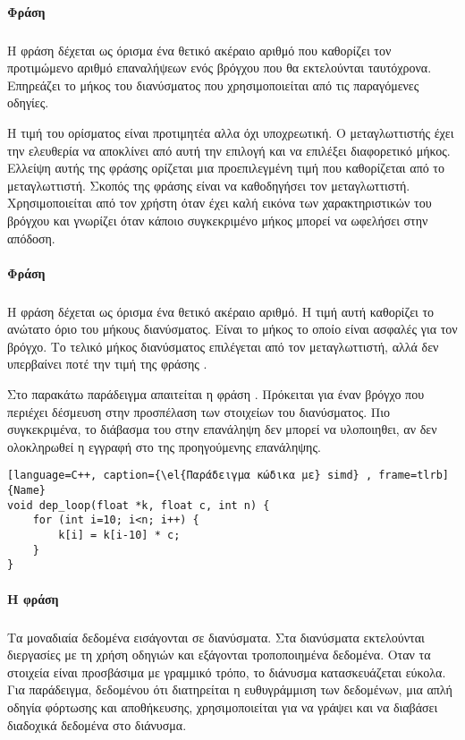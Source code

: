 \paragraph{Φράση \emph{}}
\subparagraph{}
Η φράση \emph{} δέχεται ως όρισμα ένα θετικό ακέραιο αριθμό που καθορίζει τον προτιμώμενο αριθμό επαναλήψεων ενός βρόγχου που θα εκτελούνται ταυτόχρονα. Επηρεάζει το μήκος του διανύσματος που χρησιμοποιείται από τις παραγόμενες \emph{} οδηγίες.

Η τιμή του ορίσματος είναι προτιμητέα αλλα όχι υποχρεωτική. Ο μεταγλωττιστής έχει την ελευθερία να αποκλίνει από αυτή την επιλογή και να επιλέξει διαφορετικό μήκος. Ελλείψη αυτής της φράσης ορίζεται μια προεπιλεγμένη τιμή που καθορίζεται από το μεταγλωττιστή. Σκοπός της φράσης \emph{} είναι να καθοδηγήσει τον μεταγλωττιστή. Χρησιμοποιείται από τον χρήστη όταν έχει καλή εικόνα των χαρακτηριστικών του βρόγχου και γνωρίζει όταν κάποιο συγκεκριμένο μήκος μπορεί να ωφελήσει στην απόδοση.

\paragraph{Φράση \emph{}}
\subparagraph{}
Η φράση \emph{} δέχεται ως όρισμα ένα θετικό ακέραιο αριθμό. Η τιμή αυτή καθορίζει το ανώτατο όριο του μήκους διανύσματος. Είναι το μήκος το οποίο είναι ασφαλές για τον βρόγχο. Το τελικό μήκος διανύσματος επιλέγεται από τον μεταγλωττιστή, αλλά δεν υπερβαίνει ποτέ την τιμή της φράσης \emph{}.

Στο παρακάτω παράδειγμα απαιτείται η φράση \emph{}. Πρόκειται για έναν βρόγχο που περιέχει δέσμευση στην προσπέλαση των στοιχείων του διανύσματος.
Πιο συγκεκριμένα, το διάβασμα του \emph{\en{[i-10]}} στην επανάληψη \emph{} δεν μπορεί να υλοποιηθει, αν δεν ολοκληρωθεί η εγγραφή στο \emph{} της προηγούμενης επανάληψης.
 

\begin{lstlisting}[language=C++, caption={\el{Παράδειγμα κώδικα με} simd} , frame=tlrb]{Name}
void dep_loop(float *k, float c, int n) {
	for (int i=10; i<n; i++) {
		k[i] = k[i-10] * c;
	}
}
\end{lstlisting}

\paragraph{H φράση \emph{}}
\subparagraph{}
Τα μοναδιαία δεδομένα εισάγονται σε διανύσματα. Στα διανύσματα εκτελούνται διεργασίες με τη χρήση οδηγιών \emph{} και εξάγονται τροποποιημένα δεδομένα. Οταν τα στοιχεία είναι προσβάσιμα με γραμμικό τρόπο, το διάνυσμα κατασκευάζεται εύκολα. Για παράδειγμα, δεδομένου ότι διατηρείται η ευθυγράμμιση των δεδομένων, μια απλή \emph{} οδηγία φόρτωσης και αποθήκευσης, χρησιμοποιείται για να γράψει και να διαβάσει διαδοχικά δεδομένα στο διάνυσμα.

